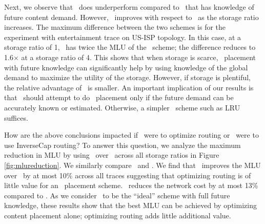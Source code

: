 Next, we observe that \invlru\ does underperform compared to \optrpfuture\ that has knowledge of future content demand. However, \invlru\ improves with respect to \optrpfuture\ as the storage ratio increases.  The maximum difference between the two schemes is for the experiment with entertainment trace on US-ISP topology. In this case, at a storage ratio of 1,  \invlru\ has twice the MLU of the \optrpfuture\ scheme; the difference reduces to 1.6$\times$ at a storage ratio of 4. This shows that when storage is scarce, \planned\  placement with future knowledge can significantly help by using knowledge of the global demand to maximize the utility of the storage. However, if storage is plentiful, the relative advantage of \optrpfuture\ is smaller. An important implication of our results is that \ancp\ should attempt to do \planned\  placement only if the future demand can be accurately known or estimated. Otherwise, a simpler \unplanned\  scheme such as LRU suffices.   






How are the above conclusions impacted if  \invlru\  were to optimize routing or   \optrpfuture\  were to use InverseCap routing? To answer this question, we analyze the maximum reduction in MLU by using \optlru\ over \invlru\ across all storage ratios in Figure  \ref{fig:mlureduction}. We similarly compare \optrpfuture\ and \invoptpfuture.   We find that \optlru\ improves the MLU over  \invlru\ by at most 10\% across all traces suggesting that optimizing routing is of little value for an \unplanned\  placement scheme.   \optrpfuture\  reduces the network cost by at most 13\% compared to \invoptpfuture. As we consider \optrpfuture\ to be the ``ideal'' scheme with full future knowledge, these results show that the best MLU can be achieved by optimizing content placement alone; optimizing routing adds little additional value.

